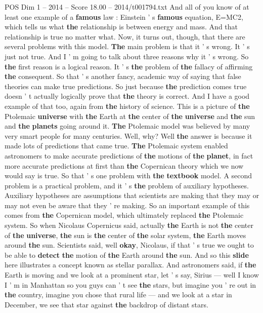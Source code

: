 \begin{textsample}{POS Dim 1 – 2014 – Score 18.00 – 2014/t001794.txt}
And all of you know of at least one example of a \textbf{famous} law : Einstein ' s \textbf{famous} equation, E=MC2, which tells us what \textbf{the} relationship is between energy and mass.
And that relationship is true no matter what.
Now, it turns out, though, that there are several problems with this model. \textbf{The} main problem is that it ' s wrong.
It ' s just not true.
And I ' m going to talk about three reasons why it ' s wrong.
So \textbf{the} first reason is a logical reason.
It ' s \textbf{the} problem of \textbf{the} fallacy of affirming \textbf{the} consequent.
So that ' s another fancy, academic way of saying that false theories can make true predictions.
So just because \textbf{the} prediction comes true doesn ' t actually logically prove that \textbf{the} theory is correct.
And I have a good example of that too, again from \textbf{the} history of science.
This is a picture of \textbf{the} Ptolemaic \textbf{universe} with \textbf{the} Earth at \textbf{the} center of \textbf{the} \textbf{universe} and \textbf{the} sun and \textbf{the} \textbf{planets} going around it. \textbf{The} Ptolemaic model was believed by many very smart people for many centuries.
Well, why?
Well \textbf{the} answer is because it made lots of predictions that came true. \textbf{The} Ptolemaic system enabled astronomers to make accurate predictions of \textbf{the} motions of \textbf{the} \textbf{planet}, in fact more accurate predictions at first than \textbf{the} Copernican theory which we now would say is true.
So that ' s one problem with \textbf{the} \textbf{textbook} model.
A second problem is a practical problem, and it ' s \textbf{the} problem of auxiliary hypotheses.
Auxiliary hypotheses are assumptions that scientists are making that they may or may not even be aware that they ' re making.
So an important example of this comes from \textbf{the} Copernican model, which ultimately replaced \textbf{the} Ptolemaic system.
So when Nicolaus Copernicus said, actually \textbf{the} Earth is not \textbf{the} center of \textbf{the} \textbf{universe}, \textbf{the} sun is \textbf{the} center of \textbf{the} solar system, \textbf{the} Earth moves around \textbf{the} sun.
Scientists said, well \textbf{okay}, Nicolaus, if that ' s true we ought to be able to \textbf{detect} \textbf{the} motion of \textbf{the} Earth around \textbf{the} sun.
And so this \textbf{slide} here illustrates a concept known as stellar parallax.
And astronomers said, if \textbf{the} Earth is moving and we look at a prominent star, let ' s say, Sirius — well I know I ' m in Manhattan so you guys can ' t see \textbf{the} stars, but imagine you ' re out in \textbf{the} country, imagine you chose that rural life — and we look at a star in December, we see that star against \textbf{the} backdrop of distant stars.

\end{textsample}
